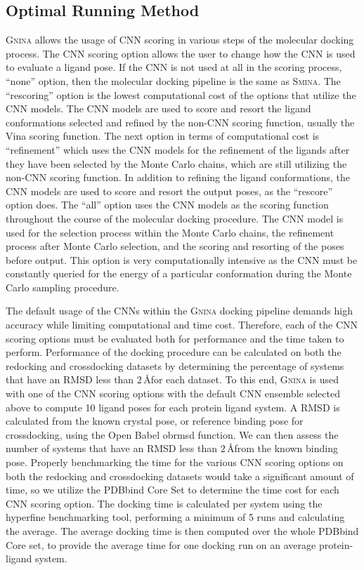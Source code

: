 \documentclass[journal=jcisd8,manuscript=article]{achemso}
\begin{document}
\subsection{Optimal Running Method}
\textsc{Gnina} allows the usage of CNN scoring in various steps of the molecular docking process. The CNN scoring option allows the user to change how the CNN is used to evaluate a ligand pose. If the CNN is not used at all in the scoring process, ``none'' option, then the molecular docking pipeline is the same as \textsc{Smina}. The ``rescoring'' option is the lowest computational cost of the options that utilize the CNN models. The CNN models are used to score and resort the ligand conformations selected and refined by the non-CNN scoring function, usually the Vina scoring function. The next option in terms of computational cost is ``refinement'' which uses the CNN models for the refinement of the ligands after they have been selected by the Monte Carlo chains, which are still utilizing the non-CNN scoring function. In addition to refining the ligand conformations, the CNN models are used to score and resort the output poses, as the ``rescore'' option does. The ``all'' option uses the CNN models as the scoring function throughout the course of the molecular docking procedure. The CNN model is used for the selection process within the Monte Carlo chains, the refinement process after Monte Carlo selection, and the scoring and resorting of the poses before output. This option is very computationally intensive as the CNN must be constantly queried for the energy of a particular conformation during the Monte Carlo sampling procedure.

The default usage of the CNNs within the \textsc{Gnina} docking pipeline demands high accuracy while limiting computational and time cost. Therefore, each of the CNN scoring options must be evaluated both for performance and the time taken to perform. Performance of the docking procedure can be calculated on both the redocking and crossdocking datasets by determining the percentage of systems that have an RMSD less than $2\,$\AA for each dataset. To this end, \textsc{Gnina} is used with one of the CNN scoring options with the default CNN ensemble selected above to compute 10 ligand poses for each protein ligand system. A RMSD is calculated from the known crystal pose, or reference binding pose for crossdocking, using the Open Babel obrmsd function. We can then assess the number of systems that have an RMSD less than $2\,$\AA from the known binding pose. Properly benchmarking the time for the various CNN scoring options on both the redocking and crossdocking datasets would take a significant amount of time, so we utilize the PDBbind Core Set to determine the time cost for each CNN scoring option. The docking time is calculated per system using the hyperfine benchmarking tool\cite{hyperfine}, performing a minimum of 5 runs and calculating the average. The average docking time is then computed over the whole PDBbind Core set, to provide the average time for one docking run on an average protein-ligand system.
\end{document}
